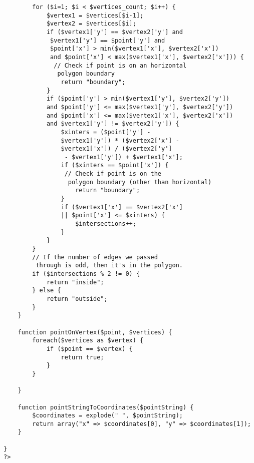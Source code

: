 \begin{verbatim}
        for ($i=1; $i < $vertices_count; $i++) {
            $vertex1 = $vertices[$i-1]; 
            $vertex2 = $vertices[$i];
            if ($vertex1['y'] == $vertex2['y'] and
             $vertex1['y'] == $point['y'] and 
             $point['x'] > min($vertex1['x'], $vertex2['x']) 
             and $point['x'] < max($vertex1['x'], $vertex2['x'])) {
              // Check if point is on an horizontal
               polygon boundary
                return "boundary";
            }
            if ($point['y'] > min($vertex1['y'], $vertex2['y']) 
            and $point['y'] <= max($vertex1['y'], $vertex2['y']) 
            and $point['x'] <= max($vertex1['x'], $vertex2['x']) 
            and $vertex1['y'] != $vertex2['y']) { 
                $xinters = ($point['y'] - 
                $vertex1['y']) * ($vertex2['x'] - 
                $vertex1['x']) / ($vertex2['y']
                 - $vertex1['y']) + $vertex1['x']; 
                if ($xinters == $point['x']) {
                 // Check if point is on the
                  polygon boundary (other than horizontal)
                    return "boundary";
                }
                if ($vertex1['x'] == $vertex2['x'] 
                || $point['x'] <= $xinters) {
                    $intersections++; 
                }
            } 
        } 
        // If the number of edges we passed
         through is odd, then it's in the polygon. 
        if ($intersections % 2 != 0) {
            return "inside";
        } else {
            return "outside";
        }
    }
 
    function pointOnVertex($point, $vertices) {
        foreach($vertices as $vertex) {
            if ($point == $vertex) {
                return true;
            }
        }
 
    }
 
    function pointStringToCoordinates($pointString) {
        $coordinates = explode(" ", $pointString);
        return array("x" => $coordinates[0], "y" => $coordinates[1]);
    }
 
}
?>
\end{verbatim}

